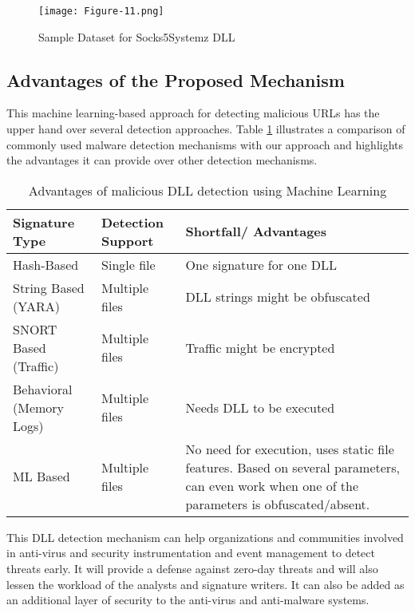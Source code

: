 \documentclass{article}
\begin{document}
\begin{figure}[h]
    \centering
    \texttt{[image: Figure-11.png]}
    \caption{Sample Dataset for Socks5Systemz DLL}
\end{figure}

\subsection{Advantages of the Proposed Mechanism}

This machine learning-based approach for detecting malicious URLs has the upper hand over several detection approaches. Table \ref{tab:advantages} illustrates a comparison of commonly used malware detection mechanisms with our approach and highlights the advantages it can provide over other detection mechanisms.

\begin{table}[htbp]
    \centering
    \caption{Advantages of malicious DLL detection using Machine Learning}
    \label{tab:advantages}
    \begin{tabular}{|l|p{3cm}|p{3cm}|}
        \hline
        \textbf{Signature Type} & \textbf{Detection Support} & \textbf{Shortfall/ Advantages} \\
        \hline
        Hash-Based & Single file & One signature for one DLL \\
        \hline
        String Based (YARA) & Multiple files & DLL strings might be obfuscated \\
        \hline
        SNORT Based (Traffic) & Multiple files & Traffic might be encrypted \\
        \hline
        Behavioral (Memory Logs) & Multiple files & Needs DLL to be executed \\
        \hline
        ML Based & Multiple files & No need for execution, uses static file features. Based on several parameters, can even work when one of the parameters is obfuscated/absent. \\
        \hline
    \end{tabular}
\end{table}

This DLL detection mechanism can help organizations and communities involved in anti-virus and security instrumentation and event management to detect threats early. It will provide a defense against zero-day threats and will also lessen the workload of the analysts and signature writers. It can also be added as an additional layer of security to the anti-virus and anti-malware systems.
\end{document}
